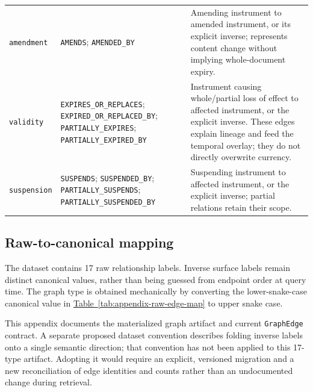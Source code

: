 \begin{table}[t]
\begin{tabular}{p{}p{}p{}}
\texttt{amendment} & \texttt{AMENDS}; \texttt{AMENDED\_BY} & Amending instrument to amended instrument, or its explicit inverse; represents content change without implying whole-document expiry. \\
\texttt{validity} & \texttt{EXPIRES\_OR\_REPLACES}; \texttt{EXPIRED\_OR\_REPLACED\_BY}; \texttt{PARTIALLY\_EXPIRES}; \texttt{PARTIALLY\_EXPIRED\_BY} & Instrument causing whole/partial loss of effect to affected instrument, or the explicit inverse. These edges explain lineage and feed the temporal overlay; they do not directly overwrite currency. \\
\texttt{suspension} & \texttt{SUSPENDS}; \texttt{SUSPENDED\_BY}; \texttt{PARTIALLY\_SUSPENDS}; \texttt{PARTIALLY\_SUSPENDED\_BY} & Suspending instrument to affected instrument, or the explicit inverse; partial relations retain their scope. \\
\bottomrule
\end{tabular}
\end{table}

\subsection{Raw-to-canonical mapping}

The dataset contains 17 raw relationship labels. Inverse surface labels remain
distinct canonical values, rather than being guessed from endpoint order at
query time. The graph type is obtained mechanically by converting the
lower-snake-case canonical value in
\hyperref[tab:appendix-raw-edge-map]{Table~\ref*{tab:appendix-raw-edge-map}}
to upper snake case.

This appendix documents the materialized graph artifact and current
\texttt{GraphEdge} contract. A separate proposed dataset convention describes
folding inverse labels onto a single semantic direction; that convention has
not been applied to this 17-type artifact. Adopting it would require an
explicit, versioned migration and a new reconciliation of edge identities and
counts rather than an undocumented change during retrieval.

